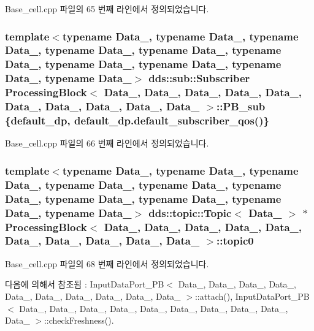Base\+\_\+cell.\+cpp 파일의 65 번째 라인에서 정의되었습니다.

\subsubsection[{\texorpdfstring{P\+B\+\_\+sub}{PB_sub}}]{\setlength{\rightskip}{0pt plus 5cm}template$<$typename Data\+\_, typename Data\+\_, typename Data\+\_, typename Data\+\_, typename Data\+\_, typename Data\+\_, typename Data\+\_, typename Data\+\_, typename Data\+\_, typename Data\+\_$>$ dds\+::sub\+::\+Subscriber {\bf Processing\+Block}$<$ Data\+\_, Data\+\_, Data\+\_, Data\+\_, Data\+\_, Data\+\_, Data\+\_, Data\+\_, Data\+\_, Data\+\_ $>$\+::P\+B\+\_\+sub \{{\bf default\+\_\+dp}, default\+\_\+dp.\+default\+\_\+subscriber\+\_\+qos()\}}\hypertarget{classProcessingBlock_a8ec9ebfda53e78f78a14df60ac1cc4fd}{}\label{classProcessingBlock_a8ec9ebfda53e78f78a14df60ac1cc4fd}


Base\+\_\+cell.\+cpp 파일의 66 번째 라인에서 정의되었습니다.

\subsubsection[{\texorpdfstring{topic0}{topic0}}]{\setlength{\rightskip}{0pt plus 5cm}template$<$typename Data\+\_, typename Data\+\_, typename Data\+\_, typename Data\+\_, typename Data\+\_, typename Data\+\_, typename Data\+\_, typename Data\+\_, typename Data\+\_, typename Data\+\_$>$ dds\+::topic\+::\+Topic$<$ Data\+\_ $>$ $\ast$ {\bf Processing\+Block}$<$ Data\+\_, Data\+\_, Data\+\_, Data\+\_, Data\+\_, Data\+\_, Data\+\_, Data\+\_, Data\+\_, Data\+\_ $>$\+::topic0}\hypertarget{classProcessingBlock_a0f1a760ea62759051759def67ecb71b2}{}\label{classProcessingBlock_a0f1a760ea62759051759def67ecb71b2}


Base\+\_\+cell.\+cpp 파일의 68 번째 라인에서 정의되었습니다.



다음에 의해서 참조됨 \+:  Input\+Data\+Port\+\_\+\+P\+B$<$ Data\+\_, Data\+\_, Data\+\_, Data\+\_, Data\+\_, Data\+\_, Data\+\_, Data\+\_, Data\+\_, Data\+\_ $>$\+::attach(), Input\+Data\+Port\+\_\+\+P\+B$<$ Data\+\_, Data\+\_, Data\+\_, Data\+\_, Data\+\_, Data\+\_, Data\+\_, Data\+\_, Data\+\_, Data\+\_ $>$\+::check\+Freshness().

